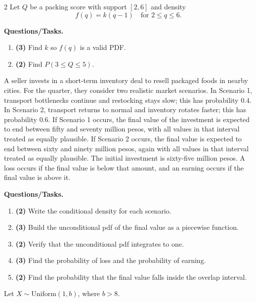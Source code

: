 \begin{multicols}{2}
		\vspace{0.25cm}
		\vspace{-0.3cm}
		Let $Q$ be a packing score with support $[2,6]$ and density
		\[
		f(q)=k(q-1)\quad\text{for }2\le q\le 6.
		\]
		
		\textbf{Questions/Tasks.}
		\begin{enumerate}[label=\textbf{\alph*)}]
			\item \textbf{(3)} Find $k$ so $f(q)$ is a valid PDF.
			\item \textbf{(2)} Find $P(3\le Q\le 5)$.
		\end{enumerate}
		
		\newpage
		\vspace{-0.3cm}
		A seller invests in a short-term inventory deal to resell packaged foods in nearby cities. For the quarter, they consider two realistic market scenarios. In Scenario 1, transport bottlenecks continue and restocking stays slow; this has probability $0.4$. In Scenario 2, transport returns to normal and inventory rotates faster; this has probability $0.6$. If Scenario 1 occurs, the final value of the investment is expected to end between fifty and seventy million pesos, with all values in that interval treated as equally plausible. If Scenario 2 occurs, the final value is expected to end between sixty and ninety million pesos, again with all values in that interval treated as equally plausible. The initial investment is sixty-five million pesos. A loss occurs if the final value is below that amount, and an earning occurs if the final value is above it.
		
		\textbf{Questions/Tasks.}
		\begin{enumerate}[label=\textbf{\alph*)}]
			\item \textbf{(2)} Write the conditional density for each scenario.
			\item \textbf{(3)} Build the unconditional pdf of the final value as a piecewise function.
			\item \textbf{(2)} Verify that the unconditional pdf integrates to one.
			\item \textbf{(3)} Find the probability of loss and the probability of earning.
			\item \textbf{(2)} Find the probability that the final value falls inside the overlap interval.
		\end{enumerate}
		
		\vspace{0.25cm}
		\vspace{-0.3cm}
		Let $X\sim \text{Uniform}(1,b)$, where $b>8$.
		

\end{multicols}
